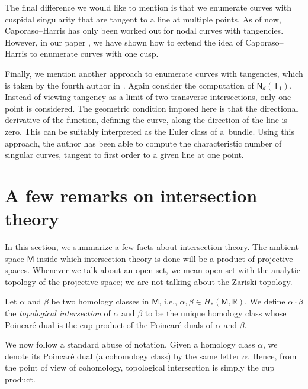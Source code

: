 \documentclass[pdftex]{sigma}
\numberwithin{equation}{section}
\begin{document}
The final difference we would like to mention is that we enumerate curves with cuspidal
singularity that are tangent to a line at multiple points. As of now, Caporaso--Harris
has only been worked out for nodal curves with tangencies.
However, in our paper \cite{IB_RM_AC_ND_arxiv}, we have shown how to extend the
idea of Caporaso--Harris to enumerate curves with one cusp.

Finally, we mention another approach to enumerate curves with tangencies,
which is taken by the fourth author in
\cite{Anant-Thesis,PAUL2024103418}.
Again consider the computation of $\mathsf{N}_d(\mathsf{T}_1)$.
Instead of viewing tangency as a limit of two transverse intersections,
only one point is considered. The geometric
condition imposed here is that the
directional derivative of the function, defining the
curve, along the direction of the line is zero. This can be suitably interpreted as the
Euler class of a~bundle.
Using this approach, the author has been able to compute the
characteristic number of singular curves, tangent to first order to a given line at one point.





\section{A few remarks on intersection theory}

In this section, we summarize a few facts about intersection theory.
The ambient space $\mathsf{M}$
inside which intersection theory is done will be a product
of projective spaces. Whenever we talk about an open set,
we mean open set with the analytic topology of the projective space;
we are not talking about the Zariski topology.

Let $\alpha$ and $\beta$ be two homology classes
in $\mathsf{M}$, i.e., $\alpha, \beta \in H_*(\mathsf{M}, \mathbb{R})$.
We define $\alpha\cdot \beta$ the \emph{topological intersection} of
$\alpha$ and $\beta$ to be the unique homology class whose Poincar\'{e} dual is the
cup product of the Poincar\'{e} duals of $\alpha$ and $\beta$.

We now follow a standard abuse of notation.
Given a homology class $\alpha$, we denote its Poincar\'{e} dual (a cohomology class)
by the same letter $\alpha$.
Hence, from the point of view of cohomology,
topological intersection is simply the cup product.
\end{document}
